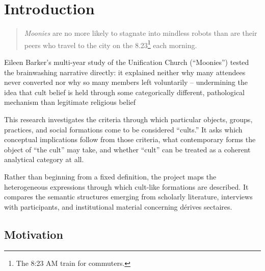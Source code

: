 \chapter{Introduction}

\blockcquote{barkerMakingMoonieChoice1989}{\textit{Moonies} are no more likely to stagnate into mindless robots than are their peers who travel to the city on the 8.23\footnote{The 8:23 AM train for commuters.} each morning.}

Eileen Barker's multi-year study of the Unification Church (``Moonies'') tested the brainwashing narrative directly: it explained neither why many attendees never converted nor why so many members left voluntarily -- undermining the idea that cult belief is held through some categorically different, pathological mechanism than legitimate religious belief \autocite{barkerMakingMoonieChoice1989}

This research investigates the criteria through which particular objects, groups, practices, and social formations come to be considered “cults.” It asks which conceptual implications follow from those criteria, what contemporary forms the object of “the cult” may take, and whether “cult” can be treated as a coherent analytical category at all.

Rather than beginning from a fixed definition, the project maps the heterogeneous expressions through which cult-like formations are described. It compares the semantic structures emerging from scholarly literature, interviews with participants, and institutional material concerning dérives sectaires.



\section{Motivation}

